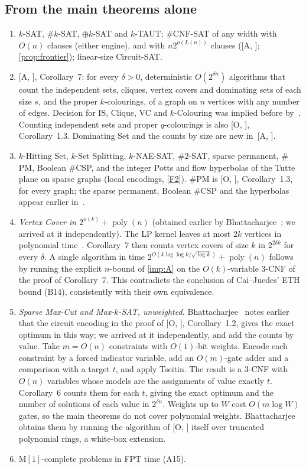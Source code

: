 \documentclass[10pt]{amsart}
\theoremstyle{plain}
\theoremstyle{definition}
\theoremstyle{remark}
\numberwithin{equation}{section}
\newcommand{\poly}{\operatorname{poly}}
\newcommand{\A}[1][]{\textup{[A\if\relax\detokenize{#1}\relax\else, #1\fi]}}
\newcommand{\Oa}[1][]{\textup{[O\if\relax\detokenize{#1}\relax\else, #1\fi]}}
\begin{document}
\subsection{From the main theorems alone}
\begin{enumerate}[label=\textup{(\roman*)}]
\item $k$-SAT, $\#k$-SAT, $\oplus k$-SAT and $k$-TAUT; $\#$CNF-SAT of any width with $O(n)$ clauses
(either engine), and with $n2^{o(L(n))}$ clauses (\A; \cref{prop:frontier}); linear-size Circuit-SAT.
\item \A, Corollary~7: for every $\delta>0$, deterministic $O(2^{\delta n})$ algorithms that count
the independent sets, cliques, vertex covers and dominating sets of each size $s$, and the proper
$k$-colourings, of a graph on $n$ vertices with any number of edges. Decision for IS, Clique, VC
and $k$-Colouring was implied before by~\cite{IPZ01}. Counting independent sets and proper
$q$-colourings is also \Oa, Corollary~1.3. Dominating Set and the counts by size are new in~\A.
\item $k$-Hitting Set, $k$-Set Splitting, $k$-NAE-SAT, $\#2$-SAT, sparse permanent, $\#$PM, Boolean
$\#$CSP, and the integer Potts and flow hyperbolas of the Tutte plane on sparse graphs (local
encodings, \ref{F2}). $\#$PM is \Oa, Corollary~1.3, for every graph; the sparse permanent, Boolean
$\#$CSP and the hyperbolas appear earlier in~\cite{Bhattacharjee26}.
\item \emph{Vertex Cover in $2^{o(k)}+\poly(n)$} (obtained earlier by
Bhattacharjee~\cite[Thm.~6.13]{Bhattacharjee26}; we arrived at it independently). The LP kernel leaves at most $2k$
vertices in polynomial time~\cite[\S2.5]{CyganEtAl15}. Corollary~7 then counts vertex covers of
size $k$ in $2^{2\delta k}$ for every $\delta$. A single algorithm in time
$2^{O(k\log\log k/\sqrt{\log k})}+\poly(n)$ follows by running the explicit $n$-bound of
\cref{imp:A} on the $O(k)$-variable $3$-CNF of the proof of Corollary~7. This contradicts the
conclusion of Cai--Juedes' ETH bound (B14), consistently with their own equivalence.
\item \emph{Sparse Max-Cut and Max-$k$-SAT, unweighted.} Bhattacharjee~\cite[Rem.~6.5]{Bhattacharjee26}
notes earlier that the circuit encoding in the proof of \Oa, Corollary~1.2, gives the exact
optimum in this way; we arrived at it independently, and add the counts by value. Take $m=O(n)$ constraints
with $O(1)$-bit weights. Encode each constraint by a forced indicator variable, add an $O(m)$-gate
adder and a comparison with a target $t$, and apply Tseitin. The result is a $3$-CNF with $O(n)$
variables whose models are the assignments of value exactly $t$. Corollary~6 counts them for each
$t$, giving the exact optimum and the number of solutions of each value in $2^{\delta n}$. Weights
up to $W$ cost $O(m\log W)$ gates, so the main theorems do not cover polynomial weights.
Bhattacharjee~\cite{Bhattacharjee26} obtains them by running the algorithm of \Oa{} itself over
truncated polynomial rings, a white-box extension.
\item $\mathrm{M}[1]$-complete problems in FPT time (A15).
\end{enumerate}
\end{document}
